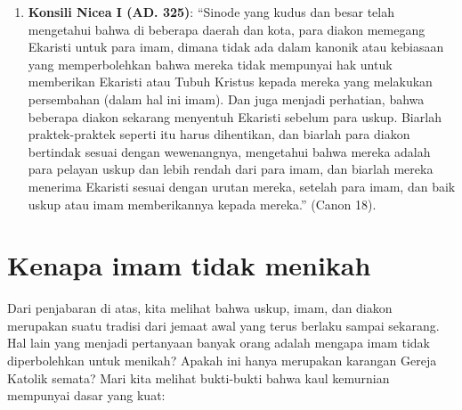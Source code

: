 \begin{enumerate}
\item \textbf{Konsili Nicea I (AD. 325)}: “Sinode yang kudus dan besar telah mengetahui bahwa di beberapa daerah dan kota, para diakon memegang Ekaristi untuk para imam, dimana tidak ada dalam kanonik atau kebiasaan yang memperbolehkan bahwa mereka tidak mempunyai hak untuk memberikan Ekaristi atau Tubuh Kristus kepada mereka yang melakukan persembahan (dalam hal ini imam). Dan juga menjadi perhatian, bahwa beberapa diakon sekarang menyentuh Ekaristi sebelum para uskup. Biarlah praktek-praktek seperti itu harus dihentikan, dan biarlah para diakon bertindak sesuai dengan wewenangnya, mengetahui bahwa mereka adalah para pelayan uskup dan lebih rendah dari para imam, dan biarlah mereka menerima Ekaristi sesuai dengan urutan mereka, setelah para imam, dan baik uskup atau imam memberikannya kepada mereka.” (Canon 18).
\end{enumerate}

\section*{Kenapa imam tidak menikah}

Dari penjabaran di atas, kita melihat bahwa uskup, imam, dan diakon merupakan suatu tradisi dari jemaat awal yang terus berlaku sampai sekarang. Hal lain yang menjadi pertanyaan banyak orang adalah mengapa imam tidak diperbolehkan untuk menikah? Apakah ini hanya merupakan karangan Gereja Katolik semata? Mari kita melihat bukti-bukti bahwa kaul kemurnian mempunyai dasar yang kuat:

